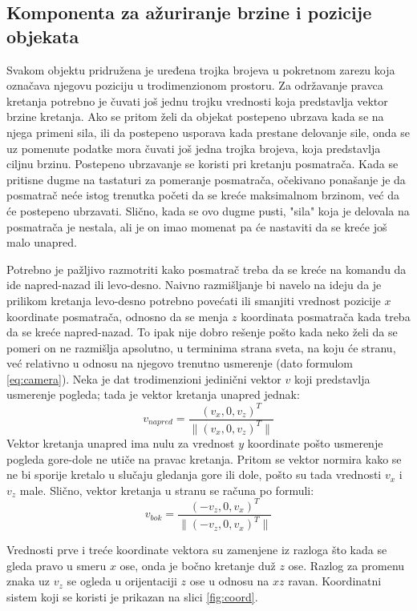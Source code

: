 \documentclass[12pt,oneside]{memoir}
\begin{document}
\subsection{Komponenta za ažuriranje brzine i pozicije objekata}

Svakom objektu pridružena je  uređena trojka brojeva u pokretnom zarezu koja označava njegovu poziciju u trodimenzionom prostoru.
Za održavanje pravca kretanja potrebno je čuvati još jednu trojku vrednosti koja predstavlja vektor brzine kretanja.
Ako se pritom želi da objekat postepeno ubrzava kada se na njega primeni sila, ili da postepeno usporava 
kada prestane delovanje sile, onda se uz pomenute podatke mora čuvati još jedna trojka brojeva, koja predstavlja ciljnu brzinu.
Postepeno ubrzavanje se koristi pri kretanju posmatrača. 
Kada se pritisne dugme na tastaturi za pomeranje posmatrača, očekivano ponašanje je da posmatrač neće istog trenutka 
početi da se kreće maksimalnom brzinom, već da će postepeno ubrzavati.
Slično, kada se ovo dugme pusti, "sila" koja je delovala na posmatrača je nestala, ali je on imao momenat pa će
nastaviti da se kreće još malo unapred.

Potrebno je pažljivo razmotriti kako posmatrač treba da se kreće na komandu da ide napred-nazad ili levo-desno.
Naivno razmišljanje bi navelo na ideju da je prilikom kretanja levo-desno potrebno povećati ili smanjiti vrednost pozicije $x$ koordinate posmatrača,
odnosno da se menja $z$ koordinata posmatrača kada treba da se kreće napred-nazad.
To ipak nije dobro rešenje pošto kada neko želi da se pomeri on ne razmišlja apsolutno, u terminima strana sveta, na koju će stranu, 
već relativno u odnosu na njegovo trenutno usmerenje (dato formulom \ref{eq:camera}).
Neka je dat trodimenzioni jedinični vektor $v$ koji predstavlja usmerenje pogleda; tada je vektor 
kretanja unapred jednak: 
$$ v_{napred} = \frac{(v_x, 0, v_z)^T}{\|(v_x, 0, v_z)^T\|} $$
Vektor kretanja unapred ima nulu za vrednost $y$ koordinate pošto usmerenje pogleda gore-dole ne utiče na pravac kretanja.
Pritom se vektor normira kako se ne bi sporije kretalo u slučaju gledanja gore ili dole, 
pošto su tada vrednosti $v_x$ i $v_z$ male.
Slično, vektor kretanja u stranu se računa po formuli:
$$ v_{bok} = \frac{(-v_z, 0, v_x)^T}{\|(-v_z, 0, v_x)^T\|} $$

Vrednosti prve i treće koordinate vektora su zamenjene iz razloga što kada se gleda pravo u smeru $x$ ose, 
onda je bočno kretanje duž $z$ ose. Razlog za promenu znaka uz $v_z$ se ogleda u orijentaciji $z$ ose u odnosu na $xz$ ravan.
Koordinatni sistem koji se koristi je prikazan na slici \ref{fig:coord}.
\end{document}
